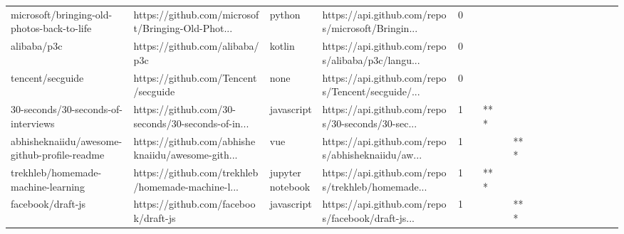 \begin{tabular}{llllrlllllllllllll}
microsoft/bringing-old-photos-back-to-life         &  https://github.com/microsoft/Bringing-Old-Phot... &            python &  https://api.github.com/repos/microsoft/Bringin... &       0 &         &        &           &                &                 &        &           &           &          &          &       &              &          \\
alibaba/p3c                                        &                     https://github.com/alibaba/p3c &            kotlin &  https://api.github.com/repos/alibaba/p3c/langu... &       0 &         &        &           &                &                 &        &           &           &          &          &       &              &          \\
tencent/secguide                                   &                https://github.com/Tencent/secguide &              none &  https://api.github.com/repos/Tencent/secguide/... &       0 &         &        &           &                &                 &        &           &           &          &          &       &              &          \\
30-seconds/30-seconds-of-interviews                &  https://github.com/30-seconds/30-seconds-of-in... &        javascript &  https://api.github.com/repos/30-seconds/30-sec... &       1 &         &    *** &           &                &                 &        &           &           &          &          &       &              &          \\
abhisheknaiidu/awesome-github-profile-readme       &  https://github.com/abhisheknaiidu/awesome-gith... &               vue &  https://api.github.com/repos/abhisheknaiidu/aw... &       1 &         &        &           &            *** &                 &        &           &           &          &          &       &              &          \\
trekhleb/homemade-machine-learning                 &  https://github.com/trekhleb/homemade-machine-l... &  jupyter notebook &  https://api.github.com/repos/trekhleb/homemade... &       1 &         &    *** &           &                &                 &        &           &           &          &          &       &              &          \\
facebook/draft-js                                  &               https://github.com/facebook/draft-js &        javascript &  https://api.github.com/repos/facebook/draft-js... &       1 &         &        &           &            *** &                 &        &           &           &          &          &       &              &          \\

\end{tabular}
